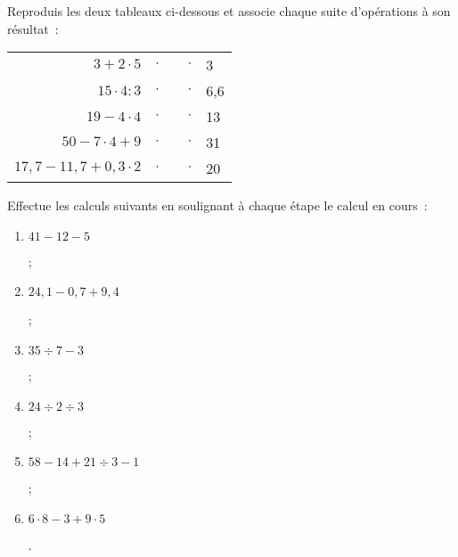 

\begin{exercice}
Reproduis les deux tableaux ci-dessous et associe chaque suite d'opérations à son résultat :
\begin{center}
 \begin{tabularx}{\linewidth}{|r|lXr|l|}
  \cline{1-1}\cline{5-5}
  $3 + 2 \cdot 5$ & $\cdot$ & & $\cdot$ & 3 \\  \cline{1-1}\cline{5-5}
  $15 \cdot 4 : 3$ & $\cdot$ & & $\cdot$ & 6,6 \\ \cline{1-1}\cline{5-5}
  $19 - 4 \cdot 4$ & $\cdot$ & & $\cdot$ & 13 \\ \cline{1-1}\cline{5-5}
  $50 - 7 \cdot 4 + 9$ & $\cdot$ & & $\cdot$ & 31 \\ \cline{1-1}\cline{5-5}
  $17,7 - 11,7 + 0,3 \cdot 2$ & $\cdot$ & & $\cdot$ & 20 \\ \cline{1-1}\cline{5-5}
  \end{tabularx}
\end{center}

\end{exercice}


\begin{exercice}
Effectue les calculs suivants en soulignant à chaque étape le calcul en cours :
\begin{enumerate}
 \item $41 - 12 - 5$ \dotfill
 
 \dotfill ;
 
 \item  $24,1 - 0,7 + 9,4$ \dotfill
 
 \dotfill ;
 
 \item $35 \div 7 - 3$ \dotfill
 
 \dotfill ;
 
 \item $24 \div 2 \div 3$ \dotfill
 
 \dotfill ;
 
 \item $58 - 14 + 21 \div 3 - 1$ \dotfill
 
 \dotfill ;
 
 \item $6 \cdot 8 - 3 + 9 \cdot 5$ \dotfill
 
 \dotfill.
 \end{enumerate}
\end{exercice}


